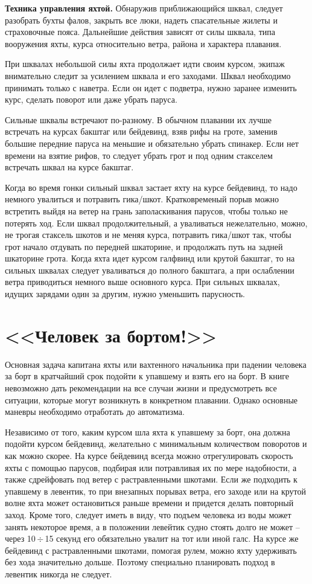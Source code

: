 \documentclass[a4paper, 12pt, twoside, final, book, russian, fittopage, cyremdash]{ncc}
\newcommand{\otdo}{\,\ensuremath{\div}\,}
\begin{document}
\textbf{Техника управления яхтой.} Обнаружив приближающийся шквал, следует разобрать бухты фалов, закрыть все люки, надеть спасательные жилеты и страховочные пояса. Дальнейшие действия зависят от силы шквала, типа вооружения яхты, курса относительно ветра, района и характера плавания.

При шквалах небольшой силы яхта продолжает идти своим курсом, экипаж внимательно следит за усилением шквала и его заходами. Шквал необходимо принимать только с наветра. Если он идет с подветра, нужно заранее изменить курс, сделать поворот или даже убрать паруса.

Сильные шквалы встречают по-разному. В обычном плавании их лучше встречать на курсах бакштаг или бейдевинд, взяв рифы на гроте, заменив большие передние паруса на меньшие и обязательно убрать спинакер. Если нет времени на взятие рифов, то следует убрать грот и под одним стакселем встречать шквал на курсе бакштаг.

Когда во время гонки сильный шквал застает яхту на курсе бейдевинд, то надо немного увалиться и потравить гика\-/шкот. Кратковременый порыв можно встретить выйдя на ветер на грань заполаскивания парусов, чтобы только не потерять ход. Если шквал продолжительный, а уваливаться нежелательно, можно, не трогая стаксель шкотов и не меняя курса, потравить гика\-/шкот так, чтобы грот начало отдувать по передней шкаторине, и продолжать путь на задней шкаторине грота. Когда яхта идет курсом галфвинд или крутой бакштаг, то на сильных шквалах следует уваливаться до полного бакштага, а при ослаблении ветра приводиться немного выше основного курса. При сильных шквалах, идущих зарядами один за другим, нужно уменьшить парусность.

\section{<<Человек за бортом!>>}

Основная задача капитана яхты или вахтенного начальника при падении человека за борт в кратчайший срок подойти к упавшему и взять его на борт. В книге невозможно дать рекомендации на все случаи жизни и предусмотреть все ситуации, которые могут возникнуть в конкретном плавании. Однако основные маневры необходимо отработать до автоматизма.

Независимо от того, каким курсом шла яхта к упавшему за борт, она должна подойти курсом бейдевинд, желательно с минимальным количеством поворотов и как можно скорее. На курсе бейдевинд всегда можно отрегулировать скорость яхты с помощью парусов, подбирая или потравливая их по мере надобности, а также сдрейфовать под ветер с растравленными шкотами. Если же подходить к упавшему в левентик, то при внезапных порывах ветра, его заходе или на крутой волне яхта может остановиться раньше времени и придется делать повторный заход. Кроме того, следует иметь в виду, что подъем человека из воды может занять некоторое время, а в положении левейтик судно стоять долго не может \--- через 10\otdo 15 секунд его обязательно увалит на тот или иной галс. На курсе же бейдевинд с растравленными шкотами, помогая рулем, можно яхту удерживать без хода значительно дольше. Поэтому специально планировать подход в левентик никогда не следует.
\end{document}
